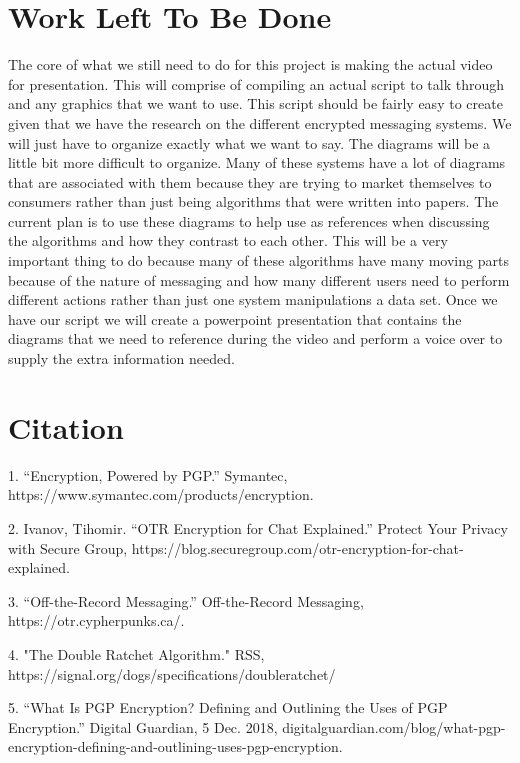 \documentclass{article}
\begin{document}
\section{Work Left To Be Done}

The core of what we still need to do for this project is making the actual video for presentation. This will comprise of compiling an actual script to talk through and any graphics that we want to use. This script should be fairly easy to create given that we have the research on the different encrypted messaging systems. We will just have to organize exactly what we want to say. The diagrams will be a little bit more difficult to organize. Many of these systems have a lot of diagrams that are associated with them because they are trying to market themselves to consumers rather than just being algorithms that were written into papers. The current plan is to use these diagrams to help use as references when discussing the algorithms and how they contrast to each other. This will be a very important thing to do because many of these algorithms have many moving parts because of the nature of messaging and how many different users need to perform different actions rather than just one system manipulations a data set. Once we have our script we will create a powerpoint presentation that contains the diagrams that we need to reference during the video and perform a voice over to supply the extra information needed. 

\section{Citation}

1. “Encryption, Powered by PGP.” Symantec, https://www.symantec.com/products/encryption.

2. Ivanov, Tihomir. “OTR Encryption for Chat Explained.” Protect Your Privacy with Secure Group, https://blog.securegroup.com/otr-encryption-for-chat-explained.

3. “Off-the-Record Messaging.” Off-the-Record Messaging, https://otr.cypherpunks.ca/.

4. "The Double Ratchet Algorithm." RSS, https://signal.org/dogs/specifications/doubleratchet/
	    
5. “What Is PGP Encryption? Defining and Outlining the Uses of PGP Encryption.” Digital Guardian, 5 Dec. 2018, digitalguardian.com/blog/what-pgp-encryption-defining-and-outlining-uses-pgp-encryption.
\end{document}
